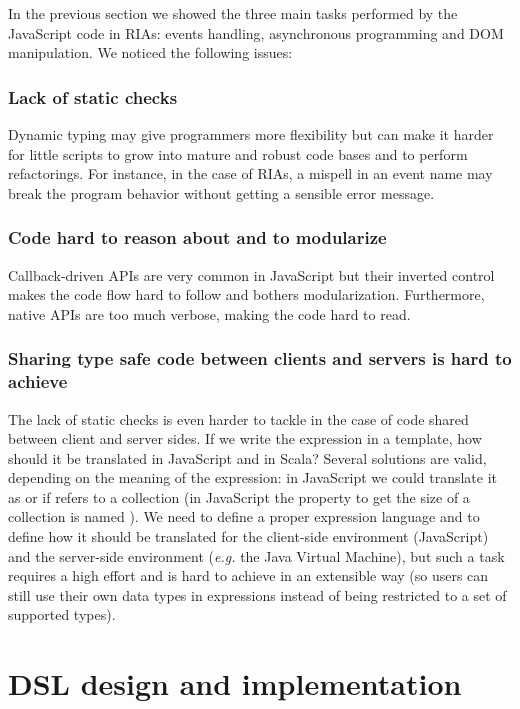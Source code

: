 \documentclass[american,english,runningheads]{llncs}
\newcommand{\eg}{\emph{e.g.}}
\begin{document}
In the previous section we showed the three main tasks performed by the JavaScript code in RIAs: events handling, asynchronous programming and DOM manipulation. We noticed the following issues:

\subsubsection{Lack of static checks}

Dynamic typing may give programmers more flexibility but can make it harder for little scripts to grow into mature and robust code bases and to perform refactorings. For instance, in the case of RIAs, a mispell in an event name may break the program behavior without getting a sensible error message.

\subsubsection{Code hard to reason about and to modularize}

Callback-driven APIs are very common in JavaScript but their inverted control makes the code flow hard to follow and bothers modularization. Furthermore, native APIs are too much verbose, making the code hard to read.

\subsubsection{Sharing type safe code between clients and servers is hard to achieve}

The lack of static checks is even harder to tackle in the case of code shared between client and server sides. If we write the expression  in a template, how should it be translated in JavaScript and in Scala? Several solutions are valid, depending on the meaning of the expression: in JavaScript we could translate it as  or  if  refers to a collection (in JavaScript the property to get the size of a collection is named ). We need to define a proper expression language and to define how it should be translated for the client-side environment (JavaScript) and the server-side environment (\eg{} the Java Virtual Machine), but such a task requires a high effort and is hard to achieve in an extensible way (so users can still use their own data types in expressions instead of being restricted to a set of supported types).

\section{DSL design and implementation}
\label{solution}
\end{document}
